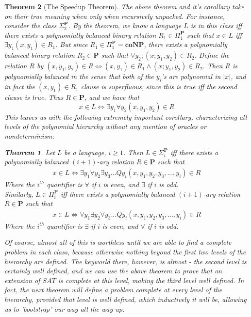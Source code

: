 \documentclass{article}
\theoremstyle{definition}
\theoremstyle{plain}
\theoremstyle{theorem}
\newtheorem{theorem}{Theorem}[section]
\begin{document}
\begin{theorem}[The Speedup Theorem]
The above theorem and it's corollary take on their true meaning when only when recursively unpacked. For instance, consider the class $\Sigma_2^{\textbf{P}}$. By the theorem, we know a language $L$ is in this class iff there exists a polynomially balanced binary relation $R_1 \in \Pi_1^{\textbf{P}}$ such that $x \in L$ iff $\exists y_1 (x,y_1) \in R_1$. But since $R_1 \in \Pi_1^{\textbf{P}} = \textbf{coNP}$, there exists a polynomially balanced binary relation $R_2 \in \textbf{P}$ such that $\forall y_2, (x;y_1,y_2) \in R_2$. Define the relation $R$ by $(x,y_1,y_2) \in R \iff (x,y_1) \in R_1 \wedge (x;y_1,y_2) \in R_2$. Then $R$ is polynomially balanced in the sense that both of the $y_i$'s are polynomial in $|x|$, and in fact the $(x,y_1) \in R_1$ clause is superfluous, since this is true iff the second clause is true. Thus $R \in \textbf{P}$, and we have that \[x \in L \iff \exists y_1 \forall y_2 (x,y_1,y_2) \in R \]
This leaves us with the following extremely important corollary, characterizing all levels of the polynomial hierarchy without any mention of oracles or nondeterminism:
\begin{theorem}
    Let $L$ be a language, $i \geq 1$. Then $L \in \Sigma_i^{\textbf{P}}$ iff there exists a polynomially balanced $(i+1)$-ary relation $R \in \textbf{P}$ such that
    \begin{align}
        x \in L \iff \exists y_1 \forall y_2 \exists y_3 ... Q y_i(x,y_1,y_2,y_3,...,y_i) \in R
    \end{align}
    Where the $i^{th}$ quantifier is $\forall$ if $i$ is even, and $\exists$ if $i$ is odd. \\
    Similarly, $L \in \Pi_i^{\textbf{P}}$ iff there exists a polynomially balanced $(i+1)$-ary relation $R \in \textbf{P}$ such that
    \begin{align}
         x \in L \iff \forall y_1 \exists y_2 \forall y_3 ... Q y_i(x,y_1,y_2,y_3,...,y_i) \in R
    \end{align}
    Where the $i^{th}$ quantifier is $\exists$ if $i$ is even, and $\forall$ if $i$ is odd.
\end{theorem}
Of course, almost all of this is worthless until we are able to find a complete problem in each class, because otherwise nothing beyond the first two levels of the hierarchy are defined. The keyworld there, however, is almost - the second level is certainly well defined, and we can use the above theorem to prove that an extension of $SAT$ is complete at this level, making the third level well defined. In fact, the next theorem will define a problem complete at every level of the hierarchy, provided that level is well defined, which inductively it will be, allowing us to 'bootstrap' our way all the way up.

\end{theorem}
\end{document}
